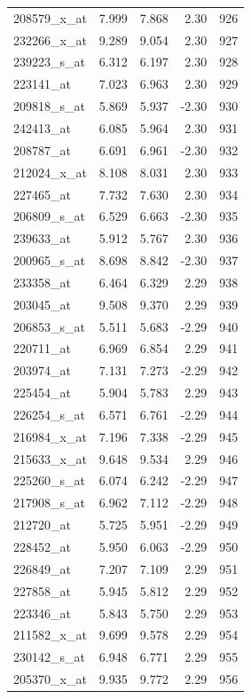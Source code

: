 \begin{footnotesize}
\begin{longtable}{lrrrr}
208579\_x\_at & 7.999 & 7.868 & 2.30 & 926 \\
232266\_x\_at & 9.289 & 9.054 & 2.30 & 927 \\
239223\_s\_at & 6.312 & 6.197 & 2.30 & 928 \\
223141\_at & 7.023 & 6.963 & 2.30 & 929 \\
209818\_s\_at & 5.869 & 5.937 & -2.30 & 930 \\
242413\_at & 6.085 & 5.964 & 2.30 & 931 \\
208787\_at & 6.691 & 6.961 & -2.30 & 932 \\
212024\_x\_at & 8.108 & 8.031 & 2.30 & 933 \\
227465\_at & 7.732 & 7.630 & 2.30 & 934 \\
206809\_s\_at & 6.529 & 6.663 & -2.30 & 935 \\
239633\_at & 5.912 & 5.767 & 2.30 & 936 \\
200965\_s\_at & 8.698 & 8.842 & -2.30 & 937 \\
233358\_at & 6.464 & 6.329 & 2.29 & 938 \\
203045\_at & 9.508 & 9.370 & 2.29 & 939 \\
206853\_s\_at & 5.511 & 5.683 & -2.29 & 940 \\
220711\_at & 6.969 & 6.854 & 2.29 & 941 \\
203974\_at & 7.131 & 7.273 & -2.29 & 942 \\
225454\_at & 5.904 & 5.783 & 2.29 & 943 \\
226254\_s\_at & 6.571 & 6.761 & -2.29 & 944 \\
216984\_x\_at & 7.196 & 7.338 & -2.29 & 945 \\
215633\_x\_at & 9.648 & 9.534 & 2.29 & 946 \\
225260\_s\_at & 6.074 & 6.242 & -2.29 & 947 \\
217908\_s\_at & 6.962 & 7.112 & -2.29 & 948 \\
212720\_at & 5.725 & 5.951 & -2.29 & 949 \\
228452\_at & 5.950 & 6.063 & -2.29 & 950 \\
226849\_at & 7.207 & 7.109 & 2.29 & 951 \\
227858\_at & 5.945 & 5.812 & 2.29 & 952 \\
223346\_at & 5.843 & 5.750 & 2.29 & 953 \\
211582\_x\_at & 9.699 & 9.578 & 2.29 & 954 \\
230142\_s\_at & 6.948 & 6.771 & 2.29 & 955 \\
205370\_x\_at & 9.935 & 9.772 & 2.29 & 956 \\

\end{longtable}
\end{footnotesize}
